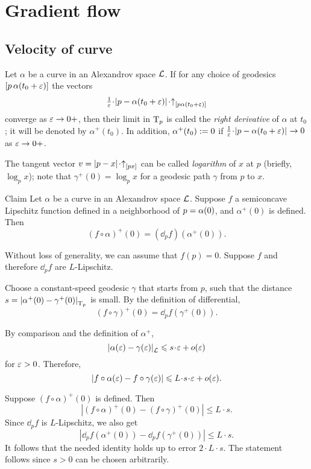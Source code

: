 
\chapter{Gradient flow}\label{chap:GF}

\section{Velocity of curve}

Let $\alpha$ be a curve in an Alexandrov space $\mathcal{L}$.
If for any choice of 
geodesics $[p\,\alpha(t_0+\varepsilon)]$ the vectors 
\[\tfrac{1}{\eps}\cdot\dist{p}{\alpha(t_0+\eps)}{}\cdot\dir p{\alpha(t_0+\eps)}\]
converge as $\varepsilon\to 0+$, then their limit in $\mathrm{T}_p$ is called the \emph{right derivative} of $\alpha$ at $t_0$; it will be denoted by $\alpha^+(t_0)$.
In addition, $\alpha^+(t_0)\mathrel{:=}0$
if $\tfrac{1}{\eps}\cdot\dist{p}{\alpha(t_0+\eps)}{}\to 0$ as $\varepsilon\to 0+$.

The tangent vector $v=\dist px{}\cdot\dir px$ can be called \emph{logarithm} of $x$ at $p$ (briefly, $\log_p x$);
note that $\gamma^+(0)=\log_px$ for a geodesic path $\gamma$ from $p$ to $x$.\label{page:log}


\begin{thm}{Claim}\label{clm:fa'=dfa'}
Let $\alpha$ be a curve in an Alexandrov space $\mathcal{L}$.
Suppose $f$ a semiconcave Lipschitz function
defined in a neighborhood of $p\z=\alpha(0)$,
and $\alpha^+(0)$ is defined.
Then 
\[(f\circ\alpha)^+(0)
=
(\dd_pf)(\alpha^+(0)).\]
\end{thm}

Without loss of generality, we can assume that $f(p)=0$.
Suppose $f$ and therefore $\dd_pf$ are $L$-Lipschitz.

Choose a constant-speed geodesic $\gamma$ that starts from $p$,
such that the distance
$s=\dist{\alpha^+(0)}{\gamma^+(0)}{\T_p}$
is small.
By the definition of differential,
\[(f\circ\gamma)^+(0)=\dd_pf(\gamma^+(0)).\]

By comparison and the definition of $\alpha^+$,
\[\dist{\alpha(\eps)}{\gamma(\eps)}{\spc{L}}\le s\cdot\eps+o(\eps)\]
for $\varepsilon>0$.
Therefore,
\[|f\circ\alpha(\eps)-f\circ\gamma(\eps)|\le L\cdot s\cdot\eps+o(\eps).\]

Suppose $(f\circ\alpha)^+(0)$ is defined.
Then
\[|(f\circ\alpha)^+(0)-(f\circ\gamma)^+(0)|\le L\cdot s.\]
Since $\dd_pf$ is $L$-Lipschitz, we also get 
\[|\dd_pf(\alpha^+(0))-\dd_pf(\gamma^+(0))|\le L\cdot s.\]
It follows that the needed identity holds up to error $2\cdot L\cdot s$.
The statement follows since $s>0$ can be chosen arbitrarily.

